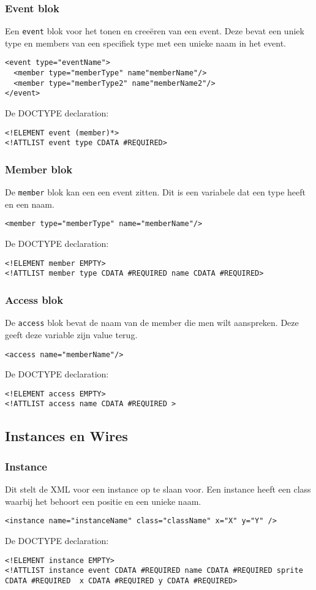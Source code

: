 \documentclass[]{article}
\begin{document}
\subsubsection{Event blok}
Een \texttt{event} blok voor het tonen en cree\"{e}ren van een event. Deze bevat een uniek type en members van een specifiek type met een unieke naam in het event.
\lstset{language=XML}
\begin{lstlisting}
<event type="eventName">
  <member type="memberType" name"memberName"/>
  <member type="memberType2" name"memberName2"/>
</event>
\end{lstlisting}
De DOCTYPE declaration: 
\lstset{language=XML}
\begin{lstlisting}
<!ELEMENT event (member)*>
<!ATTLIST event type CDATA #REQUIRED>
\end{lstlisting}
\subsubsection{Member blok}
De \texttt{member} blok kan een een event zitten. Dit is een variabele dat een type heeft en een naam.
\lstset{language=XML}
\begin{lstlisting}
<member type="memberType" name="memberName"/>
\end{lstlisting}
De DOCTYPE declaration: 
\lstset{language=XML}
\begin{lstlisting}
<!ELEMENT member EMPTY>
<!ATTLIST member type CDATA #REQUIRED name CDATA #REQUIRED>
\end{lstlisting}
\subsubsection{Access blok}
De \texttt{access} blok bevat de naam van de member die men wilt aanspreken.
Deze geeft deze variable zijn value terug.
\lstset{language=XML}
\begin{lstlisting}
<access name="memberName"/>
\end{lstlisting}
De DOCTYPE declaration: 
\lstset{language=XML}
\begin{lstlisting}
<!ELEMENT access EMPTY>
<!ATTLIST access name CDATA #REQUIRED >
\end{lstlisting}

\subsection{Instances en Wires}
\subsubsection{Instance }
Dit stelt de XML voor een instance op te slaan voor. Een instance heeft een class waarbij het behoort een positie en een unieke naam.
\lstset{language=XML}
\begin{lstlisting}
<instance name="instanceName" class="className" x="X" y="Y" />
\end{lstlisting}
De DOCTYPE declaration: 
\lstset{language=XML}
\begin{lstlisting}
<!ELEMENT instance EMPTY>
<!ATTLIST instance event CDATA #REQUIRED name CDATA #REQUIRED sprite			 CDATA #REQUIRED  x CDATA #REQUIRED y CDATA #REQUIRED>
\end{lstlisting}
\end{document}
